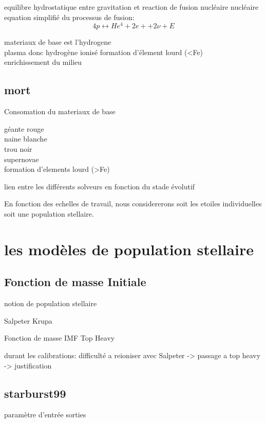 equilibre hydrostatique entre gravitation et reaction de fusion nucléaire nucléaire\\

equation simplifié du processus de fusion:
\begin{equation}
4p \leftrightarrow He^4 + 2e+ + 2\nu + E
\end{equation}




materiaux de base est l'hydrogene\\
plasma donc hydrogène ionisé 
formation d'élement lourd (<Fe)\\
enrichissement du milieu


\subsection{mort}
Consomation du materiaux de base

géante rouge\\
naine blanche\\
trou noir\\
supernovae\\
formation d'elements lourd (>Fe)



lien entre les différents solveurs en fonction du stade évolutif

En fonction des echelles de travail, nous considererons soit les etoiles individuelles soit une population stellaire.

\section{les modèles de population stellaire}

\subsection{Fonction de masse Initiale}
notion de population stellaire

Salpeter
Krupa

Fonction de masse IMF Top Heavy

durant les calibrations: difficulté a reioniser avec Salpeter -> passage a top heavy -> justification 

\subsection{starburst99}
paramètre d'entrée
sorties



